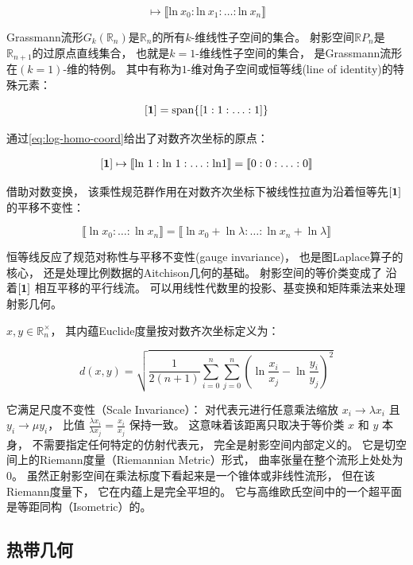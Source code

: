 ﻿\documentclass[10pt,a4paper]{article}
\numberwithin{equation}{section}
\begin{document}
\begin{equation}
[x_0:x_1:\ldots:x_n] \mapsto \llbracket \text{ln} \ x_0 : \text{ln} \ x_1 : \ldots : \text{ln} \ x_n \rrbracket
\label{eq:log-homo-coord}
\end{equation}

Grassmann流形$G_k(\mathbb R_n)$是$\mathbb R_n$的所有$k$-维线性子空间的集合。
射影空间$\mathbb R P_n$是$\mathbb R_{n+1}$的过原点直线集合，
也就是$k = 1$-维线性子空间的集合，
是Grassmann流形在$(k = 1)$-维的特例。
其中有称为$1$-维对角子空间或恒等线(line of identity)的特殊元素：

$$
[\textbf 1] = \text{span}\{[1:1:\ldots:1]\}
$$

通过\eqref{eq:log-homo-coord}给出了对数齐次坐标的原点：

$$
\begin{aligned}
[\textbf 1] \mapsto 
\llbracket \text{ln} \ 1 : \text{ln} \ 1 : \ldots : \text{ln} 1 \rrbracket
= \llbracket 0 : 0 : \ldots : 0 \rrbracket \\
\end{aligned}
$$

借助对数变换，
该乘性规范群作用在对数齐次坐标下被线性拉直为沿着恒等先$[\textbf 1]$ 的平移不变性：

$$
\llbracket \ln x_0 : \ldots : \ln x_n \rrbracket = \llbracket \ln x_0 + \ln \lambda : \ldots : \ln x_n + \ln \lambda \rrbracket
$$

恒等线反应了规范对称性与平移不变性(gauge invariance)，
也是图Laplace算子的核心，
还是处理比例数据的Aitchison几何的基础。
射影空间的等价类变成了
沿着$[\textbf 1]$ 相互平移的平行线流。
可以用线性代数里的投影、基变换和矩阵乘法来处理射影几何。

$x,y\in\mathbb R^\times_n$，
其内蕴Euclide度量按对数齐次坐标定义为：

$$ 
d(x,y) = 
\sqrt{\frac{1}{2(n+1)} \sum_{i=0}^n \sum_{j=0}^n \left( \ln\frac{x_i}{x_j} - \ln\frac{y_i}{y_j} \right)^2} 
$$

它满足尺度不变性（Scale Invariance）：
对代表元进行任意乘法缩放
$x_i \to \lambda x_i$ 且 $y_i \to \mu y_i$，
比值 $\frac{\lambda x_i}{\lambda x_j} = \frac{x_i}{x_j}$ 保持一致。
这意味着该距离只取决于等价类 $x$ 和 $y$ 本身，
不需要指定任何特定的仿射代表元，
完全是射影空间内部定义的。
它是切空间上的Riemann度量（Riemannian Metric）形式，
曲率张量在整个流形上处处为$0$。
虽然正射影空间在乘法标度下看起来是一个锥体或非线性流形，
但在该Riemann度量下，
它在内蕴上是完全平坦的。
它与高维欧氏空间中的一个超平面是等距同构（Isometric）的。


\subsection{热带几何}
\end{document}

